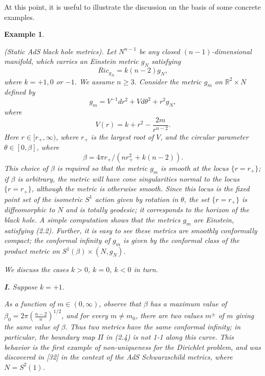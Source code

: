 \documentclass[11pt,amsfonts]{amsart}
\newtheorem{example}[theorem]{Example}
\begin{document}
\medskip

 At this point, it is useful to illustrate the discussion on the basis 
of some concrete examples.
\begin{example} \label{ex2.3}{\rm (Static AdS black hole metrics). 
Let $N^{n-1}$ be any closed $(n-1)$-dimensional manifold, which carries 
an Einstein metric $g_{N}$ satisfying
\begin{equation} \label{e2.10}
Ric_{g_{N}} = k(n-2)g_{N}, 
\end{equation}
where $k = +1, 0$ or $-1$. We assume $n \geq 3$. Consider the metric 
$g_{m}$ on ${\mathbb R}^{2}\times N$ defined by
\begin{equation} \label{e2.11}
g_{m} = V^{-1}dr^{2} + Vd\theta^{2} + r^{2}g_{N}, 
\end{equation}
where 
\begin{equation} \label{e2.12}
V(r) = k+r^{2}-\frac{2m}{r^{n-2}}. 
\end{equation}
Here $r \in  [r_{+},\infty)$, where $r_{+}$ is the largest root of $V$, 
and the circular parameter $\theta \in [0,\beta]$, where 
\begin{equation} \label{e2.13}
\beta  = 4\pi r_{+}/(nr_{+}^{2}+k(n-2)). 
\end{equation}
This choice of $\beta$ is required so that the metric $g_{m}$ is smooth 
at the locus $\{r = r_{+}\}$; if $\beta$ is arbitrary, the metric will 
have cone singularities normal to the locus $\{r = r_{+}\}$, although 
the metric is otherwise smooth. Since this locus is the fixed point set 
of the isometric $S^{1}$ action given by rotation in $\theta$, the set 
$\{r = r_{+}\}$ is diffeomorphic to $N$ and is totally geodesic; it 
corresponds to the horizon of the black hole.  A simple computation 
shows that the metrics $g_{m}$ are Einstein, satisfying (2.2). Further, 
it is easy to see these metrics are smoothly conformally compact; the 
conformal infinity of $g_{m}$ is given by the conformal class of the 
product metric on $S^{1}(\beta )\times (N, g_{N})$. 

 We discuss the cases $k > 0$, $k = 0$, $k < 0$ in turn.

{\bf I.}  Suppose $k = +1$. 

 As a function of $m \in  (0,\infty)$, observe that $\beta$ has a 
maximum value of $\beta_{0} = 2\pi (\frac{n-2}{n})^{1/2}$, and for 
every $m \neq  m_{0}$, there are two values $m^{\pm}$ of $m$ giving the 
same value of $\beta$. Thus two metrics have the same conformal 
infinity; in particular, the boundary map $\Pi$ in (2.4) is not 1-1 
along this curve. This behavior is the first example of non-uniqueness 
for the Dirichlet problem, and was discovered in [32] in the context of 
the AdS Schwarzschild metrics, where $N = S^{2}(1)$. 

}
\end{example}
\end{document}
